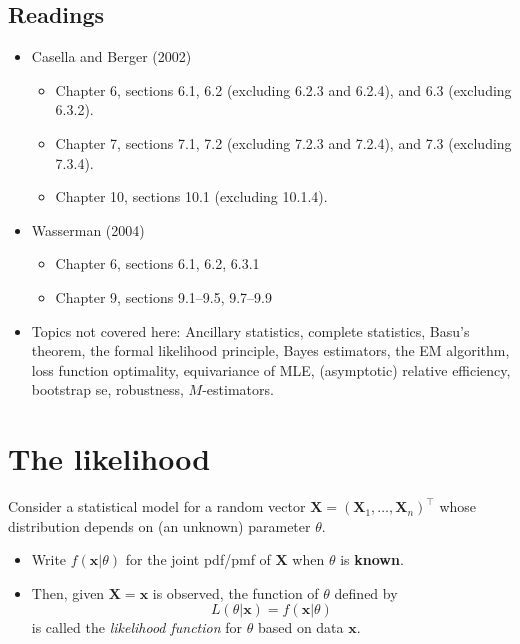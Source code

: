 \documentclass[
]{book}
\providecommand{\tightlist}{%
  \setlength{\itemsep}{0pt}\setlength{\parskip}{0pt}}
\newcommand{\bx}{{\boldsymbol x}}
\newcommand{\bX}{{\boldsymbol X}}
\theoremstyle{definition}
\theoremstyle{definition}
\theoremstyle{definition}
\theoremstyle{definition}
\theoremstyle{remark}
\begin{document}
\hypertarget{readings-3}{%
\subsection*{Readings}\label{readings-3}}

\begin{itemize}
\tightlist
\item
  Casella and Berger (2002)

  \begin{itemize}
  \tightlist
  \item
    Chapter 6, sections 6.1, 6.2 (excluding 6.2.3 and 6.2.4), and 6.3 (excluding 6.3.2).
  \item
    Chapter 7, sections 7.1, 7.2 (excluding 7.2.3 and 7.2.4), and 7.3 (excluding 7.3.4).
  \item
    Chapter 10, sections 10.1 (excluding 10.1.4).
  \end{itemize}
\item
  Wasserman (2004)

  \begin{itemize}
  \tightlist
  \item
    Chapter 6, sections 6.1, 6.2, 6.3.1
  \item
    Chapter 9, sections 9.1--9.5, 9.7--9.9
  \end{itemize}
\item
  Topics not covered here: Ancillary statistics, complete statistics, Basu's theorem, the formal likelihood principle, Bayes estimators, the EM algorithm, loss function optimality, equivariance of MLE, (asymptotic) relative efficiency, bootstrap se, robustness, \(M\)-estimators.
\end{itemize}

\hypertarget{the-likelihood}{%
\section{The likelihood}\label{the-likelihood}}

Consider a statistical model for a random vector \(\bX = (\bX_1,\dots,\bX_n)^\top\) whose distribution depends on (an unknown) parameter \(\theta\).

\begin{itemize}
\tightlist
\item
  Write \(f(\bx|\theta)\) for the joint pdf/pmf of \(\bX\) when \(\theta\) is \textbf{known}.
\item
  Then, given \(\bX=\bx\) is observed, the function of \(\theta\) defined by
  \[
  L(\theta|\bx) = f(\bx|\theta)
  \]
  is called the \emph{likelihood function} for \(\theta\) based on data \(\bx\).
\end{itemize}
\end{document}
